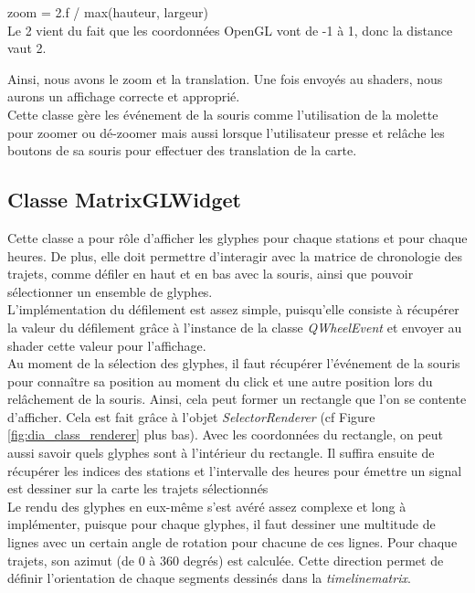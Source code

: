 \documentclass[12pt]{article}
\begin{document}
	zoom = 2.f / max(hauteur, largeur)\\

	Le 2 vient du fait que les coordonnées OpenGL vont de -1 à 1, donc la distance vaut 2.

	Ainsi, nous avons le zoom et la translation. Une fois envoyés au shaders, nous aurons un affichage correcte et approprié.\\

	Cette classe gère les événement de la souris comme l’utilisation de la molette pour zoomer ou dé-zoomer mais aussi lorsque l’utilisateur presse et relâche les boutons de sa souris pour effectuer des translation de la carte.
		
		\subsection{Classe MatrixGLWidget}		
		Cette classe a pour rôle d’afficher les glyphes pour chaque stations et pour chaque heures. De plus, elle doit permettre d’interagir avec la matrice de chronologie des trajets, comme défiler en
		haut et en bas avec la souris, ainsi que pouvoir sélectionner un ensemble de glyphes.\\

		L'implémentation du défilement est assez simple, puisqu'elle consiste à récupérer la valeur
		du défilement grâce à l'instance de la classe \textit{QWheelEvent} et envoyer au shader cette valeur pour l’affichage.\\

		Au moment de la sélection des glyphes, il faut récupérer l'événement de la souris pour connaître sa position au moment du click et une autre position lors du relâchement de la souris. Ainsi, cela peut former un rectangle que l’on se contente d’afficher. Cela est fait grâce à l’objet \textit{SelectorRenderer} (cf Figure \ref{fig:dia_class_renderer} plus bas). Avec les coordonnées du rectangle, on peut aussi savoir quels glyphes sont à l'intérieur du rectangle. Il suffira ensuite de récupérer les indices des stations et l’intervalle des heures pour émettre un signal est dessiner sur la carte les trajets sélectionnés\\

		Le rendu des glyphes en eux-même s’est avéré assez complexe et long à implémenter, puisque pour chaque glyphes, il faut dessiner une multitude de lignes avec un certain angle de rotation pour chacune de ces lignes. Pour chaque trajets, son azimut (de 0 à 360 degrés) est calculée. Cette direction permet de définir l'orientation de chaque segments dessinés dans la \textit{timelinematrix}.
		
\end{document}

